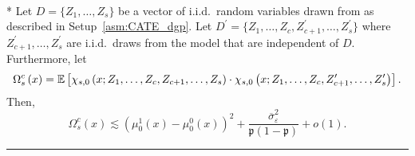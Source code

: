 \newpage
\begin{lem}\label{lem:CATE_omega_sc}\mbox{}\\*
	Let $D = \{Z_1, \dotsc, Z_{s}\}$ be a vector of i.i.d.\ random variables drawn from as described in Setup~\ref{asm:CATE_dgp}.
	Let $D^{\prime} = \{Z_1, \dotsc, Z_{c}, Z_{c+1}^{\prime}, \dotsc,  Z_{s}^{\prime}\}$ where $Z_{c+1}^{\prime}, \dotsc,  Z_{s}^{\prime}$ are i.i.d.\ draws from the model that are independent of $D$.
	Furthermore, let
	\begin{equation}
		\Omega_{s}^{c}\left(x\right)
		= \mathbb{E}\left[\chi_{s,0}\left(x; Z_1, \ldots, Z_{c}, Z_{c+1}, \ldots, Z_{s}\right) \cdot
			\chi_{s,0}\left(x; Z_1, \ldots,Z_{c}, Z_{c+1}^{\prime}, \ldots, Z_{s}^{\prime}\right)\right].
	\end{equation}
	Then,
	\begin{equation}
		\Omega_{s}^{c}\left(x\right)
		\lesssim \left(\mu_{0}^{1}\left(x\right) - \mu_{0}^{0}\left(x\right)\right)^2
		+ \frac{\overline{\sigma}^2_{\varepsilon}}{\mathfrak{p}\left(1 - \mathfrak{p}\right)} + o(1).
	\end{equation}
\end{lem}
\hrule
